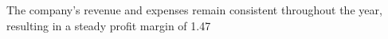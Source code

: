 

The company's revenue and expenses remain consistent throughout the year, resulting in a steady profit margin of 1.47%